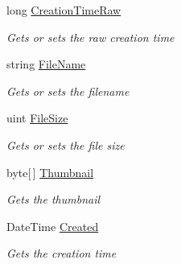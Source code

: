 \begin{DoxyCompactItemize}
\item 
long \hyperlink{class_microsoft_1_1_tools_1_1_windows_device_portal_1_1_device_portal_1_1_mrc_file_information_a2640ef101d40ab0e6c00bce43c2a6e16}{Creation\+Time\+Raw}
\begin{DoxyCompactList}\small\item\em Gets or sets the raw creation time \end{DoxyCompactList}\item 
string \hyperlink{class_microsoft_1_1_tools_1_1_windows_device_portal_1_1_device_portal_1_1_mrc_file_information_a71edd665735aa9f842c894d9592628d5}{File\+Name}
\begin{DoxyCompactList}\small\item\em Gets or sets the filename \end{DoxyCompactList}\item 
uint \hyperlink{class_microsoft_1_1_tools_1_1_windows_device_portal_1_1_device_portal_1_1_mrc_file_information_acfc5602cdc1d830f01c4913c807abea4}{File\+Size}
\begin{DoxyCompactList}\small\item\em Gets or sets the file size \end{DoxyCompactList}\item 
byte\mbox{[}$\,$\mbox{]} \hyperlink{class_microsoft_1_1_tools_1_1_windows_device_portal_1_1_device_portal_1_1_mrc_file_information_ab9d63dc358d5b0d58895250e455af881}{Thumbnail}
\begin{DoxyCompactList}\small\item\em Gets the thumbnail \end{DoxyCompactList}\item 
Date\+Time \hyperlink{class_microsoft_1_1_tools_1_1_windows_device_portal_1_1_device_portal_1_1_mrc_file_information_a1810984ebfc15911b10bb9b28272aef5}{Created}
\begin{DoxyCompactList}\small\item\em Gets the creation time \end{DoxyCompactList}\end{DoxyCompactItemize}


